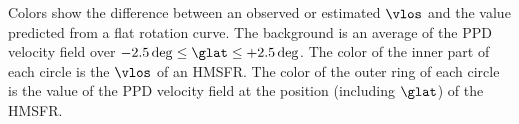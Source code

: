 \label{fig:maser_pie}
Colors show the difference between an observed or estimated $\vlos$ and the value predicted from a flat rotation curve. The background is an average of the PPD velocity field over $-2.5\deg \leq \glat \leq +2.5\deg$. The color of the inner part of each circle is the $\vlos$ of an HMSFR. The color of the outer ring of each circle is the value of the PPD velocity field at the position (including $\glat$) of the HMSFR.